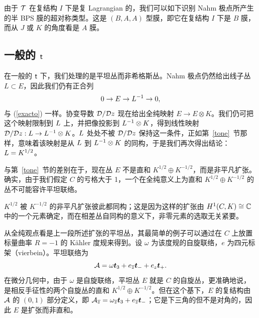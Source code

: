 由于 ${\mathcal T}$ 在复结构 $I$ 下是复 Lagrangian 的，我们可以如下识别 Nahm 极点所产生的半 BPS 膜的超对称类型。这是 $(B,A,A)$ 型膜，即它在复结构 $I$ 下是 $B$ 膜，而从 $J$ 或 $K$ 的角度看是 $A$ 膜。

\subsection{一般的 ${ \sf t}$}\label{general}

在一般的 ${ \sf t}$ 下，我们处理的是平坦丛而非希格斯丛。Nahm 极点仍然给出线子丛 $L\subset E$，因此我们仍有正合列
\begin{equation}\label{texaco} 0\to \\ E\to { L}^{-1}\to 0,\end{equation}
与 (\ref{exacto}) 一样。协变导数 ${\mathcal D}/{\mathcal D} z$ 现在给出全纯映射 $E\to E\otimes K$。我们仍可把这个映射限制到 ${ L}$ 上，并把像投影到 ${ L}^{-1}\otimes K$，得到线性映射 ${\mathcal D}/{\mathcal D} z:{ L}\to { L}^{-1}\otimes K$。${ L}$ 处处不被 ${\mathcal D}/{\mathcal D} z$ 保持这一条件，正如第~\ref{tone}~节那样，意味着该映射是从 ${ L}$ 到 ${ L}^{-1}\otimes K$ 的同构，于是我们再次得出结论：${ L}=K^{1/2}$。


与第~\ref{tone}~节的差别在于，现在丛 $E$ 不是直和 $K^{1/2}\oplus K^{-1/2}$，而是非平凡扩张。确实，由于我们假定 $C$ 的亏格大于 1，一个在全纯意义上为直和 $K^{1/2}\oplus K^{-1/2}$ 的丛不可能容许平坦联络。

$K^{1/2}$ 被 $K^{-1/2}$ 的非平凡扩张彼此都同构；这是因为这样的扩张由 $H^1(C,K)\cong {\mathbb C}$ 中的一个元素确定，而在相差丛自同构的意义下，非零元素的选取无关紧要。


从全纯观点看是上一段所述扩张的平坦丛，其最简单的例子可以通过在 $C$ 上放置标量曲率 $R=-1$ 的 Kähler 度规来得到。设 $\omega$ 为该度规的自旋联络，$e$ 为四元标架（vierbein）。平坦联络为
\begin{equation}\label{omurf}{\mathcal A}=\omega{\boldsymbol{t}}_3+e_{\overline z}{\boldsymbol{t}}_- +e_z{\boldsymbol{t}}_+.\end{equation}
在微分几何中，由于 $\omega$ 是自旋联络，平坦丛 $E$ 就是 $C$ 的自旋丛，更准确地说，是相反手征性的两个自旋丛的直和 $K^{1/2} \oplus K^{-1/2}$。但在这个基下，$E$ 的复结构由 ${\mathcal A}$ 的 $(0,1)$ 部分定义，即 ${\mathcal A}_{\overline z}=\omega_{\overline z}{\boldsymbol{t}}_3 +e_{\overline z}{\boldsymbol{t}}_-$；它是下三角的但不是对角的，因此 $E$ 是扩张而非直和。

